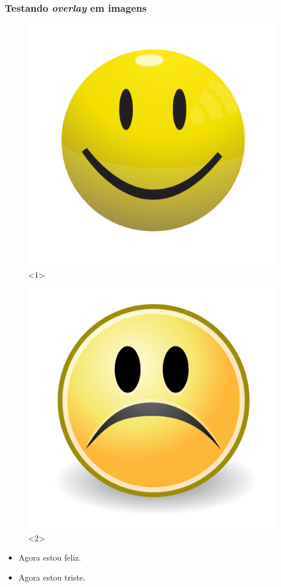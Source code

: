 \documentclass{beamer}
\begin{document}
	\begin{frame}
		\frametitle{Testando \textit{overlay} em imagens}
		\begin{figure}
			\centering
			\includegraphics[scale=0.2]{img/smiley.jpeg}<1>
			\centering
			\includegraphics[scale=0.2]{img/sad-smiley.png}<2>
		\end{figure}
		\begin{itemize}
			\item<1> Agora estou feliz.
			\item<2> Agora estou triste.
		\end{itemize}
	\end{frame}
	
\end{document}
